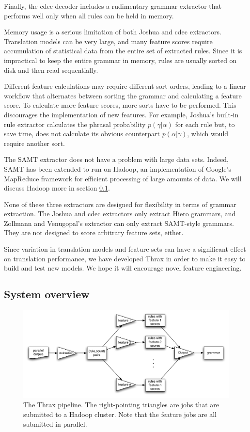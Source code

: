 \documentclass[11pt]{article}
\begin{document}
Finally, the cdec decoder \cite {cdec} includes a rudimentary grammar extractor that performs well only when all rules can be held in memory.

Memory usage is a serious limitation of both Joshua and cdec extractors. Translation models can be very large, and many feature scores require accumulation of statistical data from the entire set of extracted rules. Since it is impractical to keep the entire grammar in memory, rules are usually sorted on disk and then read sequentially.

Different feature calculations may require different sort orders, leading to a linear workflow that alternates between sorting the grammar and calculating a feature score. To calculate more feature scores, more sorts have to be performed. This discourages the implementation of new features. For example, Joshua's built-in rule extractor calculates the phrasal probability $p(\gamma|\alpha)$ for each rule but, to save time, does not calculate its obvious counterpart $p(\alpha|\gamma)$, which would require another sort.

The SAMT extractor does not have a problem with large data sets. Indeed, SAMT has been extended \cite{venugopal2009hadoop} to run on Hadoop, an implementation of Google's MapReduce framework for efficient processing of large amounts of data. We will discuss Hadoop more in section \ref{design}.

None of these three extractors are designed for flexibility in terms of grammar extraction. The Joshua and cdec extractors only extract Hiero grammars, and Zollmann and Venugopal's extractor can only extract SAMT-style grammars. They are not designed to score arbitrary feature sets, either.

Since variation in translation models and feature sets can have a significant effect on translation performance, we have developed Thrax in order to make it easy to build and test new models. We hope it will encourage novel feature engineering.

\subsection{System overview}
\label{design}
\begin{figure}
\includegraphics[width=6in]{figures/thrax-pipeline}
\caption{The Thrax pipeline. The right-pointing triangles are jobs that are submitted to a Hadoop cluster. Note that the feature jobs are all submitted in parallel.\label{thrax-workflow}}
\end{figure}
\end{document}
